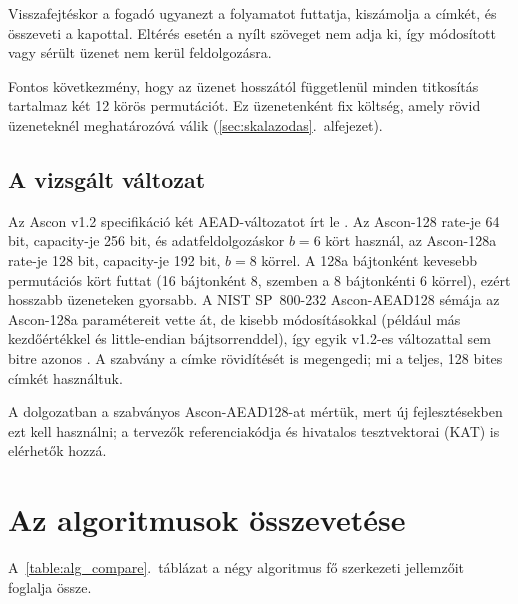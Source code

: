 \documentclass[a4paper,12pt]{report}
\theoremstyle{definition}
\theoremstyle{remark}
\begin{document}
Visszafejtéskor a fogadó ugyanezt a folyamatot futtatja, kiszámolja a címkét, és összeveti a kapottal. Eltérés esetén a nyílt szöveget nem adja ki, így módosított vagy sérült üzenet nem kerül feldolgozásra.

Fontos következmény, hogy az üzenet hosszától függetlenül minden titkosítás tartalmaz két 12 körös permutációt. Ez üzenetenként fix költség, amely rövid üzeneteknél meghatározóvá válik (\ref{sec:skalazodas}.~alfejezet).

\subsection{A vizsgált változat}\label{sec:ascon_valtozat}

Az Ascon v1.2 specifikáció két AEAD-változatot írt le \cite{Dobraunig2021}. Az Ascon-128 rate-je 64 bit, capacity-je 256 bit, és adatfeldolgozáskor $b = 6$ kört használ, az Ascon-128a rate-je 128 bit, capacity-je 192 bit, $b = 8$ körrel. A 128a bájtonként kevesebb permutációs kört futtat (16 bájtonként 8, szemben a 8 bájtonkénti 6 körrel), ezért hosszabb üzeneteken gyorsabb. A NIST SP~800-232 Ascon-AEAD128 sémája az Ascon-128a paramétereit vette át, de kisebb módosításokkal (például más kezdőértékkel és little-endian bájtsorrenddel), így egyik v1.2-es változattal sem bitre azonos \cite{NISTSP800232}. A szabvány a címke rövidítését is megengedi; mi a teljes, 128 bites címkét használtuk.

A dolgozatban a szabványos Ascon-AEAD128-at mértük, mert új fejlesztésekben ezt kell használni; a tervezők referenciakódja és hivatalos tesztvektorai (KAT) is elérhetők hozzá.

\section{Az algoritmusok összevetése}\label{sec:alg_osszehasonlitas}

A~\ref{table:alg_compare}.~táblázat a négy algoritmus fő szerkezeti jellemzőit foglalja össze.
\end{document}

